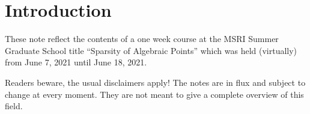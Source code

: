 \chapter{Introduction}

These note reflect the contents of a one week course at the MSRI
Summer Graduate School title ``Sparsity of Algebraic Points'' which
was held (virtually) from June 7, 2021 until June 18, 2021.

Readers beware, the usual disclaimers apply! The notes are in flux and
subject to change at every moment. They are not meant to give a
complete overview of this field.



